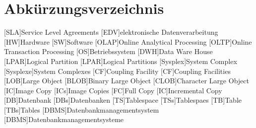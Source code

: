 \chapter*{Abkürzungsverzeichnis}
\begin{acronym}
  
  [SLA]{Service Level Agreements}
  [EDV]{elektronische Datenverarbeitung}
  [HW]{Hardware}
  [SW]{Software}
  [OLAP]{Online Analytical Processing}
  [OLTP]{Online Transaction Processing}
  [OS]{Betriebssystem}
  [DWH]{Data Ware House}
  [LPAR]{Logical Partition}
  [LPAR]{Logical Partitions}
  [Sysplex]{System Complex}
  [Sysplexe]{System Complexes}
  [CF]{Coupling Facility}
  [CF]{Coupling Facilities}
  [LOB]{Large Object}
  [BLOB]{Binary Large Object}
  [CLOB]{Character Large Object}
  [IC]{Image Copy}
  [ICs]{Image Copies}
  [FC]{Full Copy}
  [IC]{Incremental Copy}
  [DB]{Datenbank}
  [DBs]{Datenbanken}
  [TS]{Tablespace}
  [TSs]{Tablespaes}
  [TB]{Table}
  [TBs]{Tables}
  [DBMS]{Datenbankmanagementsystem}
  [DBMS]{Datenbankmanagementsysteme}
  
  
\end{acronym}


